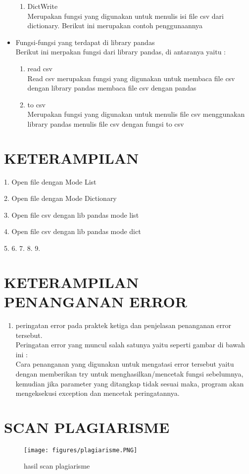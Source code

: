 \begin{itemize}
\begin{enumerate}
\item DictWrite\\
Merupakan fungsi yang digunakan untuk menulis isi file csv dari dictionary. Berikut ini merupakan contoh penggunaannya

\end{enumerate}
\item Fungsi-fungsi yang terdapat di library pandas\\
Berikut ini merpakan fungsi dari library pandas, di antaranya yaitu :
\begin{enumerate}
    \item read csv\\
    Read csv merupakan fungsi yang digunakan untuk membaca file csv dengan library pandas
     membaca file csv dengan pandas
    \item to csv\\
    Merupakan fungsi yang digunakan untuk menulis file csv menggunakan library pandas
     menulis file csv dengan fungsi to csv
\end{enumerate}
\end{itemize}
\section{KETERAMPILAN}
1. Open file dengan Mode List
 
2. Open file dengan Mode Dictionary

3. Open file csv dengan lib pandas mode list

4. Open file csv dengan lib pandas mode dict 

5. 
6. 
7. 
8. 
9. 
\section{KETERAMPILAN PENANGANAN ERROR}
\begin{enumerate}
\item peringatan error pada praktek ketiga dan penjelasan penanganan error tersebut.\\
Peringatan error yang muncul salah satunya yaitu seperti gambar di bawah ini :\\

		Cara penanganan yang digunakan untuk mengatasi error tersebut yaitu dengan memberikan try untuk menghasilkan/mencetak fungsi sebelumnya, kemudian jika parameter yang ditangkap tidak sesuai maka, program akan mengeksekusi exception dan mencetak peringatannya.
\end{enumerate}
\section{SCAN PLAGIARISME}
                \begin{figure}[H]
				\texttt{[image: figures/plagiarisme.PNG]}
				\centering
				\caption{hasil scan plagiarisme}
				\end{figure}